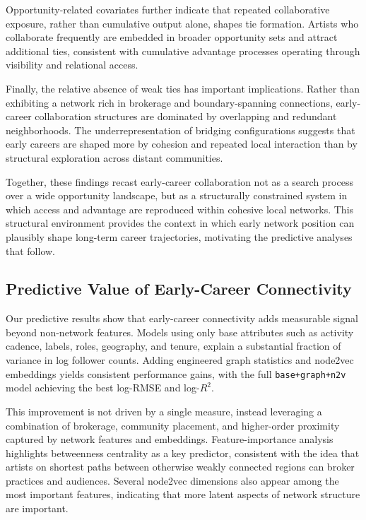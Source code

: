 \documentclass[fleqn,10pt]{wlscirep}
\begin{document}
Opportunity-related covariates further indicate that repeated collaborative exposure, rather than cumulative output alone, shapes tie formation. Artists who collaborate frequently are embedded in broader opportunity sets and attract additional ties, consistent with cumulative advantage processes operating through visibility and relational access.

Finally, the relative absence of weak ties has important implications. Rather than exhibiting a network rich in brokerage and boundary-spanning connections, early-career collaboration structures are dominated by overlapping and redundant neighborhoods. The underrepresentation of bridging configurations suggests that early careers are shaped more by cohesion and repeated local interaction than by structural exploration across distant communities.

Together, these findings recast early-career collaboration not as a search process over a wide opportunity landscape, but as a structurally constrained system in which access and advantage are reproduced within cohesive local networks. This structural environment provides the context in which early network position can plausibly shape long-term career trajectories, motivating the predictive analyses that follow.

\subsection*{Predictive Value of Early-Career Connectivity}

Our predictive results show that early-career connectivity adds measurable signal beyond non-network features. Models using only base attributes such as activity cadence, labels, roles, geography, and tenure, explain a substantial fraction of variance in log follower counts. Adding engineered graph statistics and node2vec embeddings yields consistent performance gains, with the full \texttt{base+graph+n2v} model achieving the best log-RMSE and log-$R^2$.

This improvement is not driven by a single measure, instead leveraging a combination of brokerage, community placement, and higher-order proximity captured by network features and embeddings. Feature-importance analysis highlights betweenness centrality as a key predictor, consistent with the idea that artists on shortest paths between otherwise weakly connected regions can broker practices and audiences. Several node2vec dimensions also appear among the most important features, indicating that more latent aspects of network structure are important.
\end{document}
